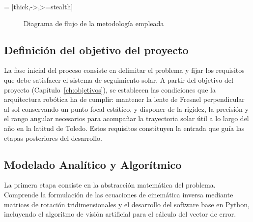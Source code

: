  = [thick,->,>=stealth]
\begin{figure}[H]
\centering
{}
\caption{Diagrama de flujo de la metodología empleada}
\label{fig:diagrama_metodologia}
\end{figure}

\subsection{Definición del objetivo del proyecto}
La fase inicial del proceso consiste en delimitar el problema y fijar los requisitos que debe satisfacer el sistema de seguimiento solar. A partir del objetivo del proyecto (Capítulo~\ref{ch:objetivos}), se establecen las condiciones que la arquitectura robótica ha de cumplir: mantener la lente de Fresnel perpendicular al sol conservando un punto focal estático, y disponer de la rigidez, la precisión y el rango angular necesarios para acompañar la trayectoria solar útil a lo largo del año en la latitud de Toledo. Estos requisitos constituyen la entrada que guía las etapas posteriores del desarrollo.

\subsection{Modelado Analítico y Algorítmico}
La primera etapa consiste en la abstracción matemática del problema. Comprende la formulación de las ecuaciones de cinemática inversa mediante matrices de rotación tridimensionales y el desarrollo del software base en Python, incluyendo el algoritmo de visión artificial para el cálculo del vector de error.

